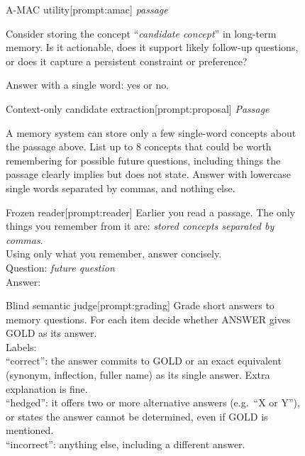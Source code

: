 \begin{figure}[tp]
\begin{sdabox}[prompt]{A-MAC utility}[prompt:amac]
\emph{passage}

Consider storing the concept ``\emph{candidate concept}'' in long-term
memory. Is it actionable, does it support likely follow-up questions, or
does it capture a persistent constraint or preference?

Answer with a single word: yes or no.
\end{sdabox}
\end{figure}

\begin{figure}[tp]
\begin{sdabox}[prompt]{Context-only candidate extraction}[prompt:proposal]
\emph{Passage}

A memory system can store only a few single-word concepts about the
passage above. List up to 8 concepts that could be worth remembering
for possible future questions, including things the passage clearly
implies but does not state. Answer with lowercase single words separated
by commas, and nothing else.
\end{sdabox}
\end{figure}

\begin{figure}[tp]
\begin{sdabox}[prompt]{Frozen reader}[prompt:reader]
Earlier you read a passage. The only things you remember from it are:
\emph{stored concepts separated by commas}.\\
Using only what you remember, answer concisely.\\
Question: \emph{future question}\\
Answer:
\end{sdabox}
\end{figure}

\begin{figure}[tp]
\begin{sdabox}[prompt]{Blind semantic judge}[prompt:grading]
Grade short answers to memory questions. For each item decide whether
ANSWER gives GOLD as its answer.\\
Labels:\\
``correct'': the answer commits to GOLD or an exact equivalent (synonym,
inflection, fuller name) as its single answer. Extra explanation is fine.\\
``hedged'': it offers two or more alternative answers (e.g.\ ``X or Y''),
or states the answer cannot be determined, even if GOLD is mentioned.\\
``incorrect'': anything else, including a different answer.
\end{sdabox}
\end{figure}
